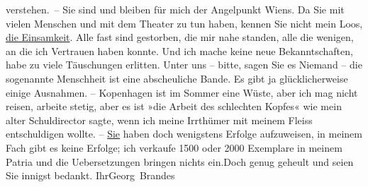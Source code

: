 \begin{ledgroupsized}[t]{13cm}
               verstehen. – Sie sind und bleiben für mich der Angelpunkt Wiens. Da Sie mit vielen Menschen und mit dem Theater zu tun haben, kennen
               Sie nicht mein Loos, \uline{die Einsamkeit}. Alle fast sind
               gestorben, die mir nahe standen, alle {\pb}die wenigen, an die ich Vertrauen
               haben konnte. Und ich mache keine neue Bekanntschaften, habe zu viele Täuschungen
               erlitten. Unter uns – bitte, sagen Sie es Niemand – die sogenannte Menschheit ist
               eine abscheuliche Bande. Es gibt ja glücklicherweise einige Ausnahmen. – Kopenhagen ist im Sommer eine Wüste, aber ich mag
               nicht reisen, arbeite stetig, aber es ist »die Arbeit des schlechten Kopfes« wie mein
               alter Schuldirector sagte, wenn
               ich meine Irrthümer mit meinem Fleiss entschuldigen wollte. – \uline{Sie} haben doch wenigstens Erfolge aufzuweisen, in meinem Fach gibt es
               keine Erfolge; ich verkaufe 1500 oder 2000 Exemplare in meinem Patria und die
               Uebersetzungen bringen nichts ein.\hspace*{2em}Doch genug
               geheult und seien Sie innigst bedankt. Ihr\spacefill\mbox{Georg Brandes}\pend
           
         
         \endnumbering{}\end{ledgroupsized}  \newcommand{\dateiname}{L02445}\newcommand{\titel}{Georg Brandes an Arthur Schnitzler, 12. 7. 1925}\newcommand{\editorInnen}{Martin Anton Müller und Gerd-Hermann Susen}
      